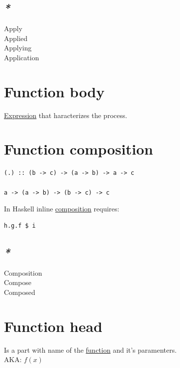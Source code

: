\documentclass[a4paper,14pt,oneside]{book}
\begin{document}
\subsection{\emph{*}}
\label{sec:org8eab6da}

\label{orgc6b1d81}Apply\\
\label{orgddce002}Applied\\
\label{org950e91e}Applying\\
\label{org5c027e8}Application\\

\section{\label{orgece0dc1}Function body}
\label{sec:orgbb516f7}
\hyperref[org6aa6989]{Expression} that haracterizes the process.\\

\section{\label{org822e273}Function composition}
\label{sec:orgf51f5f9}
\begin{verbatim}
(.) :: (b -> c) -> (a -> b) -> a -> c

a -> (a -> b) -> (b -> c) -> c
\end{verbatim}

In Haskell inline \hyperref[orgb060001]{composition} requires:\\
\begin{verbatim}
h.g.f $ i
\end{verbatim}

\subsection{\emph{*}}
\label{sec:org3f083a8}

\label{org71c9cee}Composition\\
\label{org88f76f7}Compose\\
\label{org4c4e70a}Composed\\

\section{\label{orgeb39ab8}Function head}
\label{sec:orgabed20e}
Is a part with name of the \hyperref[org8cc2ae4]{function} and it's paramenters.\\
AKA: \(f(x)\)\\
\end{document}
